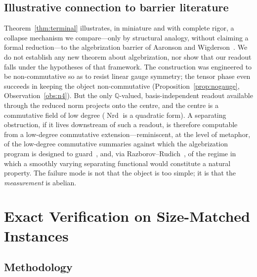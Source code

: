 \documentclass[pdflatex,sn-mathphys-num]{sn-jnl}
\theoremstyle{thmstyleone}%
\theoremstyle{thmstyletwo}%
\theoremstyle{thmstylethree}%
\newcommand{\QQ}{\mathbb{Q}}
\newcommand{\Nrd}{\operatorname{Nrd}}
\begin{document}
\subsection{Illustrative connection to barrier literature}

Theorem~\ref{thm:terminal} illustrates, in miniature and with complete rigor,
a collapse mechanism we compare---only by structural analogy, without
claiming a formal reduction---to the algebrization barrier of Aaronson and
Wigderson~\cite{AW}. We do not establish any new theorem about
algebrization, nor show that our readout falls under the hypotheses of
that framework. The construction was
engineered to be non-commutative so as to resist linear gauge symmetry; the
tensor phase even succeeds in keeping the object non-commutative
(Proposition~\ref{prop:nogauge}, Observation~\ref{obs:n4}). But the only
$\QQ$-valued, basis-independent readout available through the reduced norm
projects onto the centre, and the centre is a commutative field of low
degree ($\Nrd$ is a quadratic form). A separating obstruction, if it lives
downstream of such a readout, is therefore computable from a low-degree
commutative extension---reminiscent, at the level of metaphor, of the
low-degree commutative summaries against which the algebrization program
is designed to guard~\cite{AW}, and, via Razborov--Rudich~\cite{RR}, of the
regime in which a smoothly varying separating functional would constitute a
natural property. The failure mode is not that the object is too simple; it is that the
\emph{measurement} is abelian.

\newpage

\section{Exact Verification on Size-Matched Instances}\label{sec:experiments}

\subsection{Methodology}
\end{document}
